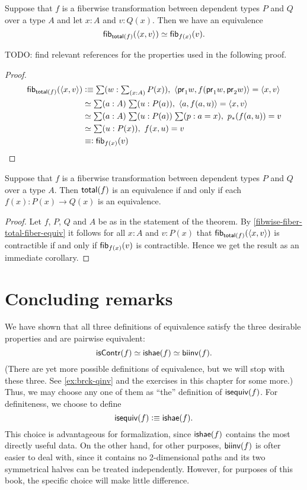 \begin{thm}\label{fibwise-fiber-total-fiber-equiv}
Suppose that $f$ is a fiberwise transformation between dependent types $P$ and
$Q$ over a type $A$ and let $x:A$ and $v:Q(x)$. Then we have an equivalence
\begin{equation*}
\mathsf{fib}_{\mathsf{total}(f)}({\langle x,v\rangle}) \simeq \mathsf{fib}_{f(x)}(v).
\end{equation*}
\end{thm}

TODO: find relevant references for the properties used in the following proof.

\begin{proof}
\begin{align*}
\hfib{\total{f}}{\pairr{x,v}} 
& \defeq \sm{w:\sm{x:A}P(x)}\pairr{\proj{1}w,f(\proj{1}w,\proj{2}w)}=\pairr{x,v}\\
& \eqv{}{} \sm{a:A}{u:P(a)}\pairr{a,f(a,u)}=\pairr{x,v}\\
& \eqv{}{} \sm{a:A}{u:P(a)}{p:a=x}\trans{p}{f(a,u)}=v\\
& \eqv{}{} \sm{u:P(x)}f(x,u)=v\\
& \defeqop \hfib{f(x)}{v}
\end{align*}
\end{proof}

\begin{thm}\label{thm:total-fiber-equiv}
Suppose that $f$ is a fiberwise transformation between dependent types
$P$ and $Q$ over a type $A$. Then $\mathsf{total}(f)$ is an equivalence if and only
if each $f(x):P(x)\to Q(x)$ is an equivalence.
\end{thm}

\begin{proof}
Let $f$, $P$, $Q$ and $A$ be as in the statement of the theorem.
By \autoref{fibwise-fiber-total-fiber-equiv} it follows for all
$x:A$ and $v:P(x)$ that
$\mathsf{fib}_{\mathsf{total}(f)}({\langle x,v\rangle})$ is contractible if and only if
$\mathsf{fib}_{f(x)}(v)$ is contractible. Hence we get the result as an
immediate corollary.
\end{proof}

\section{Concluding remarks}
\label{sec:concluding-remarks}

We have shown that all three definitions of equivalence satisfy the three desirable properties and are pairwise equivalent:
\[ \mathsf{isContr}(f) \simeq \mathsf{ishae}(f) \simeq \mathsf{biinv}(f) . \]
(There are yet more possible definitions of equivalence, but we will stop with these three.
See \autoref{ex:brck-qinv} and the exercises in this chapter for some more.)
Thus, we may choose any one of them as ``the'' definition of $\mathsf{isequiv} (f)$.
For definiteness, we choose to define
\[ \mathsf{isequiv}(f) \vcentcolon\equiv \mathsf{ishae}(f).\]
This choice is advantageous for formalization, since $\mathsf{ishae}(f)$ contains the most directly useful data.
On the other hand, for other purposes, $\mathsf{biinv}(f)$ is ofter easier to deal with, since it contains no 2-dimensional paths and its two symmetrical halves can be treated independently.
However, for purposes of this book, the specific choice will make little difference.



